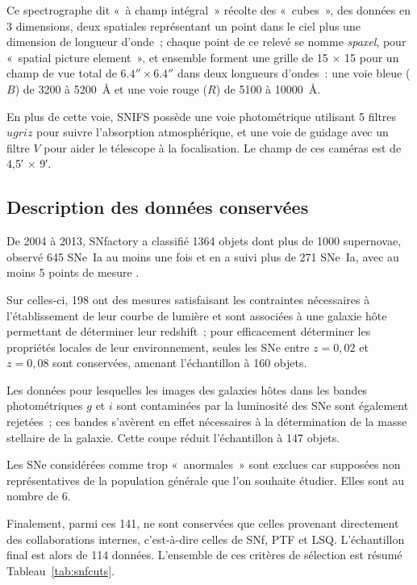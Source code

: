 \documentclass[../main/main.tex]{subfiles}
\begin{document}
Ce spectrographe dit «~à champ intégral~» récolte des «~cubes~», des données en
3 dimensions, deux spatiales représentant un point dans le ciel plus une
dimension de longueur d'onde~; chaque point de ce relevé se nomme
\textit{spaxel}, pour «~spatial picture element~», et ensemble forment une
grille de 15 $\times$ 15 pour un champ de vue total de
$\ang{;;6,4}\times\ang{;;6,4}$ dans deux longueurs d'ondes~: une voie bleue
($B$) de 3200 à \SI{5200}{\angstrom} et une voie rouge ($R$) de 5100 à
\SI{10000}{\angstrom}.

En plus de cette voie, SNIFS possède une voie photométrique utilisant 5 filtres
$ugriz$ pour suivre l'absorption atmosphérique, et une voie de guidage avec un
filtre $V$ pour aider le télescope à la focalisation. Le champ de ces caméras
est de \ang{;4,5;} $\times$ \ang{;9;}.

\subsection{Description des données conservées}\label{ssec:snfdata}

De 2004 à 2013, SNfactory a classifié 1364 objets dont plus de 1000 supernovae,
observé 645 SNe~Ia au moins une fois et en a suivi plus de 271 SNe~Ia, avec au
moins 5 points de mesure \citep{copin2013}.

Sur celles-ci, 198 ont des mesures satisfaisant les contraintes nécessaires à
l'établissement de leur courbe de lumière et sont associées à une galaxie hôte
permettant de déterminer leur redshift~; pour efficacement déterminer les
propriétés locales de leur environnement, seules les SNe entre $z = 0,02$ et $z
= 0,08$ sont conservées, amenant l'échantillon à 160 objets.

Les données pour lesquelles les images des galaxies hôtes dans les bandes
photométriques $g$ et $i$ sont contaminées par la luminosité des SNe sont
également rejetées~; ces bandes s'avèrent en effet nécessaires à la
détermination de la masse stellaire de la galaxie. Cette coupe réduit
l'échantillon à 147 objets.

Les SNe considérées comme trop «~anormales~» sont exclues car supposées non
représentatives de la population générale que l'on souhaite étudier. Elles sont
au nombre de 6.

Finalement, parmi ces 141, ne sont conservées que celles provenant directement
des collaborations internes, c'est-à-dire celles de SNf, PTF et LSQ.
L'échantillon final est alors de 114 données. L'ensemble de ces critères de
sélection est résumé Tableau~\ref{tab:snfcuts}.
\end{document}

